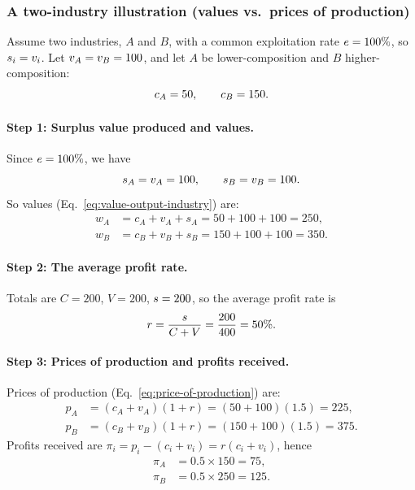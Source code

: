 \subsubsection*{A two-industry illustration (values vs.\ prices of production)}

\begin{example}
Assume two industries, $A$ and $B$, with a common exploitation rate $e = 100\%$,
so $s_i = v_i$. Let $v_A=v_B=100$, and let $A$ be lower-composition
and $B$ higher-composition:
\[
  c_A=50,\qquad c_B=150.
\]

\paragraph{Step 1: Surplus value produced and values.}
Since $e=100\%$, we have
\[
  s_A=v_A=100,\qquad s_B=v_B=100.
\]
So values (Eq.~\eqref{eq:value-output-industry}) are:
\[
\begin{aligned}
w_A &= c_A + v_A + s_A = 50 + 100 + 100 = 250,\\
w_B &= c_B + v_B + s_B = 150 + 100 + 100 = 350.
\end{aligned}
\]

\paragraph{Step 2: The average profit rate.}
Totals are $C=200$, $V=200$, $s=200$, so the average profit rate is
\[
  r=\frac{s}{C+V}=\frac{200}{400}=50\%.
\]

\paragraph{Step 3: Prices of production and profits received.}
Prices of production (Eq.~\eqref{eq:price-of-production}) are:
\[
\begin{aligned}
p_A &= (c_A + v_A)(1+r) = (50+100)(1.5) = 225,\\
p_B &= (c_B + v_B)(1+r) = (150+100)(1.5) = 375.
\end{aligned}
\]
Profits received are \(\pi_i = p_i - (c_i+v_i)=r(c_i+v_i)\), hence
\[
\begin{aligned}
\pi_A &= 0.5 \times 150 = 75,\\
\pi_B &= 0.5 \times 250 = 125.
\end{aligned}
\]


\end{example}
